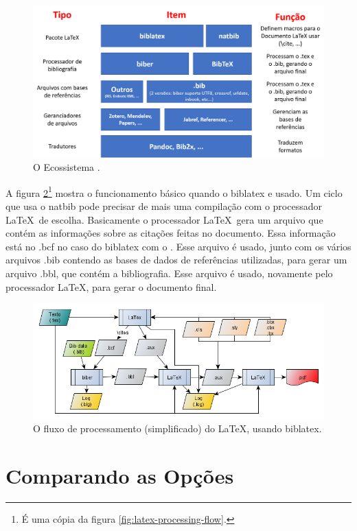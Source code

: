 \begin{figure}[hbt]
    \centering
    \includegraphics[width=0.9\linewidth]{Images/mundolatexport}
    \caption{O Ecossistema \parencite{bibera2012}.}
    \label{fig:mundolatexport}
\end{figure}



A figura \ref{fig:latex-processing-flow2}\footnote{É uma cópia da figura \ref{fig:latex-processing-flow}.} mostra o funcionamento básico quando o biblatex e usado. Um ciclo que usa o natbib pode precisar de mais uma compilação com o processador \LaTeX\  de escolha. Basicamente o processador \LaTeX\   gera um arquivo que contém as informações sobre as citações feitas no documento. Essa informação está no .bcf no caso do biblatex com o . Esse arquivo é usado, junto com os vários arquivos .bib contendo as bases de dados de referências utilizadas, para gerar um arquivo .bbl, que contém a bibliografia. Esse arquivo é usado, novamente pelo processador \LaTeX, para gerar o documento final. 


\begin{figure}[hbt]
    \centering
    \includegraphics[width=0.8\linewidth]{"Images/LaTeX processing flow"}
    \caption{O fluxo de processamento (simplificado) do \LaTeX, usando
    biblatex.}
    \label{fig:latex-processing-flow2}
\end{figure}

\section{Comparando as Opções}


